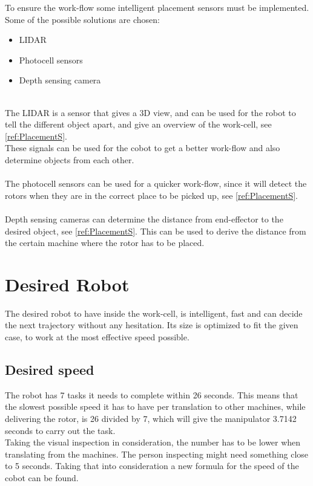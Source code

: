 To ensure the work-flow some intelligent placement sensors must be implemented. Some of the possible solutions are chosen:\\

\begin{itemize}
    \item LIDAR
    \item Photocell sensors
    \item Depth sensing camera
\end{itemize}
\\
The LIDAR is a sensor that gives a 3D view, and can be used for the robot to tell the different object apart, and give an overview of the work-cell, see \ref{ref:PlacementS}.\\
These signals can be used for the cobot to get a better work-flow and also determine objects from each other.\\
\\
The photocell sensors can be used for a quicker work-flow, since it will detect the rotors when they are in the correct place to be picked up, see \ref{ref:PlacementS}.\\
\\
Depth sensing cameras can determine the distance from end-effector to the desired object, see \ref{ref:PlacementS}. This can be used to derive the distance from the certain machine where the rotor has to be placed.\\


\section{Desired Robot}\label{IdealRobot}

The desired robot to have inside the work-cell, is intelligent, fast and can decide the next trajectory without any hesitation. Its size is optimized to fit the given case, to work at the most effective speed possible.\\

\subsection{Desired speed}

The robot has 7 tasks it needs to complete within 26 seconds. This means that the slowest possible speed it has to have per translation to other machines, while delivering the rotor, is 26 divided by 7, which will give the manipulator 3.7142 seconds to carry out the task.\\
Taking the visual inspection in consideration, the number has to be lower when translating from the machines. The person inspecting might need something close to 5 seconds. Taking that into consideration a new formula for the speed of the cobot can be found.\\


